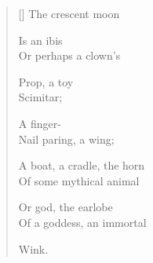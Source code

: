 \label{ch:over_venezia}
\settowidth{\versewidth}{                          Wink.}
\begin{verse}[\versewidth]
The crescent moon

Is an ibis\\
Or perhaps a clown's

Prop, a toy\\
Scimitar;

A finger-\\
Nail paring, a wing;

A boat, a cradle, the horn\\
Of some mythical animal

Or god, the earlobe\\
Of a goddess, an immortal

                          Wink.
\end{verse}
